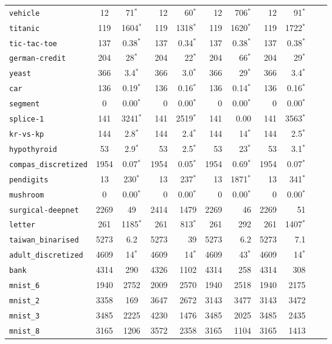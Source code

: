 \begin{tabular}{lccrrrrrrrr}
\texttt{vehicle} & 12 & 71$^*$ & 12 & 60$^*$ & 12 & 706$^*$ & 12 & 91$^*$\\
\texttt{titanic} & 119 & 1604$^*$ & 119 & 1318$^*$ & 119 & 1620$^*$ & 119 & 1722$^*$\\
\texttt{tic-tac-toe} & 137 & 0.38$^*$ & 137 & 0.34$^*$ & 137 & 0.38$^*$ & 137 & 0.38$^*$\\
\texttt{german-credit} & 204 & 28$^*$ & 204 & 22$^*$ & 204 & 66$^*$ & 204 & 29$^*$\\
\texttt{yeast} & 366 & 3.4$^*$ & 366 & 3.0$^*$ & 366 & 29$^*$ & 366 & 3.4$^*$\\
\texttt{car} & 136 & 0.19$^*$ & 136 & 0.16$^*$ & 136 & 0.14$^*$ & 136 & 0.16$^*$\\
\texttt{segment} & 0 & 0.00$^*$ & 0 & 0.00$^*$ & 0 & 0.00$^*$ & 0 & 0.00$^*$\\
\texttt{splice-1} & 141 & 3241$^*$ & 141 & 2519$^*$ & 141 & 0.00 & 141 & 3563$^*$\\
\texttt{kr-vs-kp} & 144 & 2.8$^*$ & 144 & 2.4$^*$ & 144 & 14$^*$ & 144 & 2.5$^*$\\
\texttt{hypothyroid} & 53 & 2.9$^*$ & 53 & 2.5$^*$ & 53 & 23$^*$ & 53 & 3.1$^*$\\
\texttt{compas\_discretized} & 1954 & 0.07$^*$ & 1954 & 0.05$^*$ & 1954 & 0.69$^*$ & 1954 & 0.07$^*$\\
\texttt{pendigits} & 13 & 230$^*$ & 13 & 237$^*$ & 13 & 1871$^*$ & 13 & 341$^*$\\
\texttt{mushroom} & 0 & 0.00$^*$ & 0 & 0.00$^*$ & 0 & 0.00$^*$ & 0 & 0.00$^*$\\
\texttt{surgical-deepnet} & 2269 & 49 & 2414 & 1479 & 2269 & 46 & 2269 & 51\\
\texttt{letter} & 261 & 1185$^*$ & 261 & 813$^*$ & 261 & 292 & 261 & 1407$^*$\\
\texttt{taiwan\_binarised} & 5273 & 6.2 & 5273 & 39 & 5273 & 6.2 & 5273 & 7.1\\
\texttt{adult\_discretized} & 4609 & 14$^*$ & 4609 & 14$^*$ & 4609 & 43$^*$ & 4609 & 14$^*$\\
\texttt{bank} & 4314 & 290 & 4326 & 1102 & 4314 & 258 & 4314 & 308\\
\texttt{mnist\_6} & 1940 & 2752 & 2009 & 2570 & 1940 & 2518 & 1940 & 2175\\
\texttt{mnist\_2} & 3358 & 169 & 3647 & 2672 & 3143 & 3477 & 3143 & 3472\\
\texttt{mnist\_3} & 3485 & 2225 & 4230 & 1476 & 3485 & 2025 & 3485 & 2435\\
\texttt{mnist\_8} & 3165 & 1206 & 3572 & 2358 & 3165 & 1104 & 3165 & 1413\\

\end{tabular}
